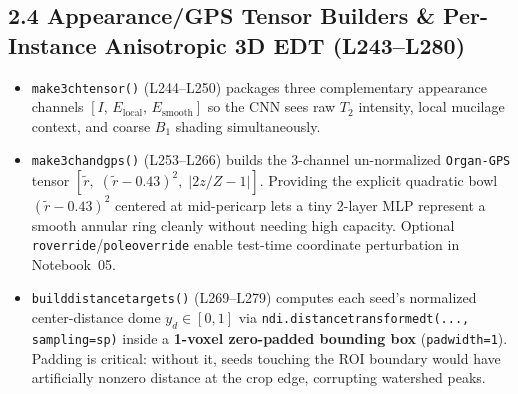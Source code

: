 \documentclass[10pt,a4paper]{article}
\renewcommand{\_}{\origunderscore\allowbreak}
\begin{document}
\subsection*{2.4 Appearance/GPS Tensor Builders \& Per-Instance Anisotropic 3D EDT (L243--L280)}
\begin{annotbox}
\begin{itemize}
    \item \texttt{make\_3ch\_tensor()} (L244--L250) packages three complementary appearance channels $[I,\, E_{\text{local}},\, E_{\text{smooth}}]$ so the CNN sees raw $T_2$ intensity, local mucilage context, and coarse $B_1$ shading simultaneously.
    \item \texttt{make\_3ch\_and\_gps()} (L253--L266) builds the 3-channel un-normalized \texttt{Organ-GPS} tensor $[\tilde{r},\; (\tilde{r} - 0.43)^2,\; |2z/Z - 1|]$. Providing the explicit quadratic bowl $(\tilde{r} - 0.43)^2$ centered at mid-pericarp lets a tiny 2-layer MLP represent a smooth annular ring cleanly without needing high capacity. Optional \texttt{r\_override}/\texttt{pole\_override} enable test-time coordinate perturbation in Notebook~05.
    \item \texttt{build\_distance\_targets()} (L269--L279) computes each seed's normalized center-distance dome $y_d \in [0, 1]$ via \texttt{ndi.distance\_transform\_edt(..., sampling=sp)} inside a \textbf{1-voxel zero-padded bounding box} (\texttt{pad\_width=1}). Padding is critical: without it, seeds touching the ROI boundary would have artificially nonzero distance at the crop edge, corrupting watershed peaks.
\end{itemize}
\end{annotbox}
\end{document}
